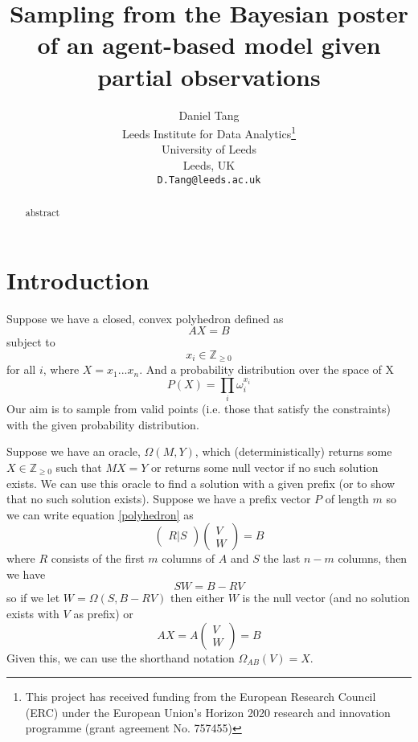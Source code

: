 \documentclass{article}
\title{Sampling from the Bayesian poster of an agent-based model given partial observations}
\author{
  Daniel Tang\\
  Leeds Institute for Data Analytics\thanks{This project has received funding from the European Research Council (ERC) under the European Union’s Horizon 2020 research and innovation programme (grant agreement No. 757455)}\\
  University of Leeds\\
  Leeds, UK\\
  \texttt{D.Tang@leeds.ac.uk} \\
}
\begin{document}
\maketitle

\begin{abstract}
abstract
\end{abstract}


\section{Introduction}

Suppose we have a closed, convex polyhedron defined as
\begin{equation}
AX = B
\label{polyhedron}
\end{equation}
subject to
\[
x_i \in \mathbb{Z}_{\ge 0}
\]
for all $i$, where $X = x_1...x_n$. And a probability distribution over the space of X
\begin{equation}
P(X) = \prod_i \omega_i^{x_i}
\label{probability}
\end{equation}
Our aim is to sample from valid points (i.e. those that satisfy the constraints) with the given probability distribution.

Suppose we have an oracle, $\Omega(M,Y)$, which (deterministically) returns some $X\in \mathbb{Z}_{\ge0}$ such that $MX=Y$ or returns some null vector if no such solution exists. We can use this oracle to find a solution with a given prefix (or to show that no such solution exists). Suppose we have a prefix vector $P$ of length $m$ so we can write equation \ref{polyhedron} as
\[
\begin{pmatrix}
R|S
\end{pmatrix}
\begin{pmatrix}
V \\
W 
\end{pmatrix}
= B
\]
where $R$ consists of the first $m$ columns of $A$ and $S$ the last $n-m$ columns, then we have
\[
SW = B - RV
\]
so if we let $W = \Omega(S,B-RV)$ then either $W$ is the null vector (and no solution exists with $V$ as prefix) or
\[
AX = A\begin{pmatrix}
V \\
W 
\end{pmatrix}
= B
\]
Given this, we can use the shorthand notation $\Omega_{AB}(V) = X$.
\end{document}
